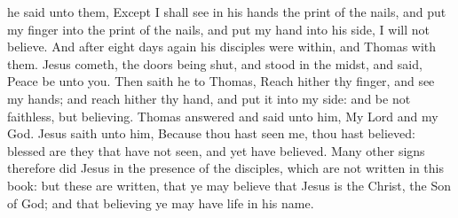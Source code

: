 he said unto them, Except I shall see in his hands the print of the nails, and put my finger into the print of the nails, and put my hand into his side, I will not believe.  And after eight days again his disciples were within, and Thomas with them. Jesus cometh, the doors being shut, and stood in the midst, and said, Peace be unto you. Then saith he to Thomas, Reach hither thy finger, and see my hands; and reach hither thy hand, and put it into my side: and be not faithless, but believing. Thomas answered and said unto him, My Lord and my God. Jesus saith unto him, Because thou hast seen me, thou hast believed: blessed are they that have not seen, and yet have believed.  Many other signs therefore did Jesus in the presence of the disciples, which are not written in this book: but these are written, that ye may believe that Jesus is the Christ, the Son of God; and that believing ye may have life in his name. 



